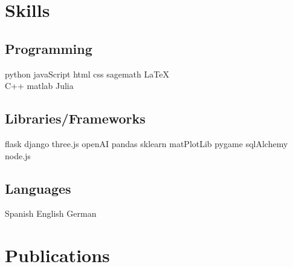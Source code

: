 \documentclass[]{plushcv}
\begin{document}
\hfill
\begin{minipage}[t]{0.25\textwidth} 


\section{Skills}
\subsection{Programming}
python \textbullet{} javaScript  \textbullet{} html \textbullet{} css \textbullet{} sagemath \textbullet{} \LaTeX\ \\ 
{}
 C++ \textbullet{}  matlab \textbullet{} Julia %
 \sectionsep

 \subsection{Libraries/Frameworks}
flask \textbullet{} django \textbullet{} three.js \textbullet{} openAI \textbullet{} pandas \textbullet{} sklearn  \textbullet{} matPlotLib \textbullet{} pygame \textbullet{}   sqlAlchemy \textbullet{}  node.js \\
\sectionsep
\subsection{Languages}
Spanish \textbullet{} English \textbullet{} German 


\section{Publications}



\end{minipage}
\end{document}
